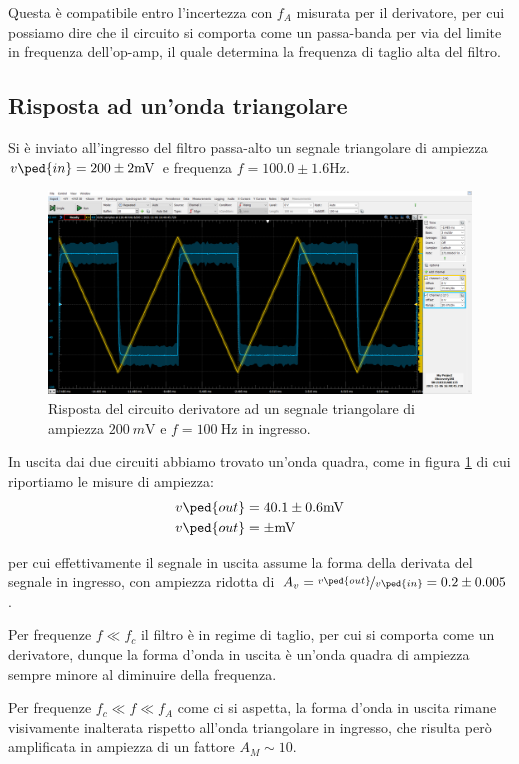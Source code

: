 \documentclass[10pt,a4paper]{article}
\begin{document}
Questa è compatibile entro l'incertezza con $f_A$ misurata per il derivatore,
per cui possiamo dire che il circuito si comporta come un passa-banda per via
del limite in frequenza dell'op-amp, il quale determina la frequenza di taglio
alta del filtro.

\subsection{Risposta ad un'onda triangolare}
Si è inviato all'ingresso del filtro passa-alto un segnale triangolare di
ampiezza $v\ped{in} = 200 \pm 2 \si{m\V}$ e frequenza
$f = 100.0 \pm 1.6 \si{\Hz}$.

\begin{figure}[htbp]
\centering
\includegraphics[scale=0.4]{derivatore}
\caption{Risposta del circuito derivatore ad un segnale triangolare di ampiezza
$\SI{200}{m\V}$ e $f = \SI{100}{\Hz}$ in ingresso. \label{fig: dertrg}}
\end{figure}

In uscita dai due circuiti abbiamo trovato un'onda quadra, come in figura
\ref{fig: dertrg} di cui riportiamo le misure di ampiezza:
\begin{align*}
v\ped{out} &= 40.1 \pm 0.6 \si{m\V} \\
v\ped{out} &=  \pm  \si{m\V}
\end{align*}

per cui effettivamente il segnale in uscita assume la forma della derivata
del segnale in ingresso, con ampiezza ridotta di
$A_v = \nicefrac{v\ped{out}}{v\ped{in}} = 0.2\pm 0.005 $.

Per frequenze $f \ll f_c$ il filtro è in regime di taglio, per cui si comporta
come un derivatore, dunque la forma d'onda in uscita è un'onda quadra di
ampiezza sempre minore al diminuire della frequenza.

Per frequenze $f_c \ll f \ll f_A$ come ci si aspetta, la forma d'onda in uscita
rimane visivamente inalterata rispetto all'onda triangolare in ingresso,
che risulta però amplificata in ampiezza di un fattore $A_M \sim 10$.
\end{document}
